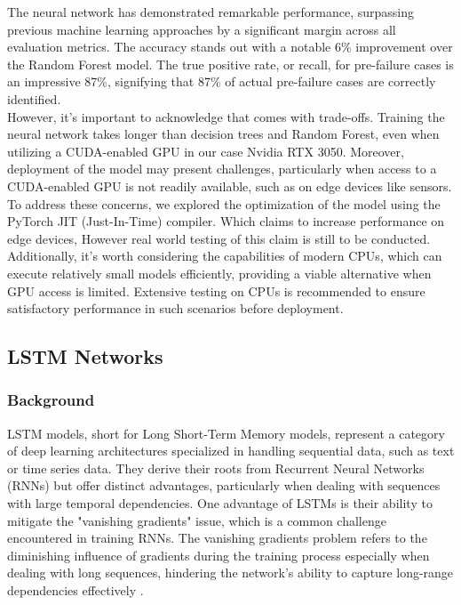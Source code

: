 \documentclass{article}
\begin{document}
The neural network has demonstrated remarkable performance, surpassing previous machine learning approaches by a significant margin across all evaluation metrics. The accuracy stands out with a notable 6\% improvement over the Random Forest model. The true positive rate, or recall, for pre-failure cases is an impressive 87\%, signifying that 87\% of actual pre-failure cases are correctly identified.\\

However, it's important to acknowledge that comes with trade-offs. Training the neural network takes longer than decision trees and Random Forest, even when utilizing a CUDA-enabled GPU in our case Nvidia RTX 3050. Moreover, deployment of the model may present challenges, particularly when access to a CUDA-enabled GPU is not readily available, such as on edge devices like sensors.\\

To address these concerns, we explored the optimization of the model using the PyTorch JIT (Just-In-Time) compiler. Which claims to increase performance on edge devices, However real world testing of this claim is still to be conducted. Additionally, it's worth considering the capabilities of modern CPUs, which can execute relatively small models efficiently, providing a viable alternative when GPU access is limited. Extensive testing on CPUs is recommended to ensure satisfactory performance in such scenarios before deployment.

\subsection{LSTM Networks}
\subsubsection{Background}

LSTM models, short for Long Short-Term Memory models, represent a category of deep learning architectures specialized in handling sequential data, such as text or time series data. They derive their roots from Recurrent Neural Networks (RNNs) but offer distinct advantages, particularly when dealing with sequences with large temporal dependencies. One advantage of LSTMs is their ability to mitigate the "vanishing gradients" issue, which is a common challenge encountered in training RNNs. The vanishing gradients problem refers to the diminishing influence of gradients during the training process especially when dealing with long sequences, hindering the network's ability to capture long-range dependencies effectively \cite{zhang2023}. \\
\end{document}
